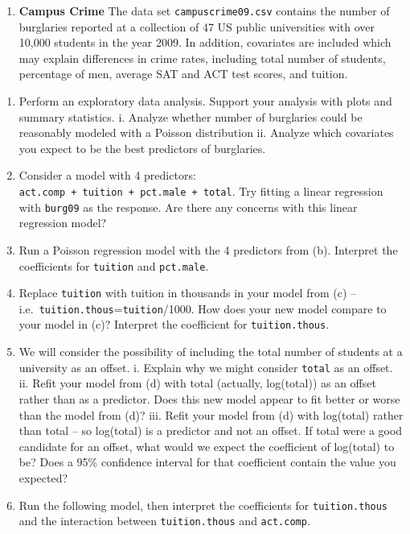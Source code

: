 \documentclass[
]{krantz}
\providecommand{\tightlist}{%
  \setlength{\itemsep}{0pt}\setlength{\parskip}{0pt}}
\begin{document}
\begin{enumerate}
\def\labelenumi{\arabic{enumi}.}
\setcounter{enumi}{4}
\tightlist
\item
  \textbf{Campus Crime} The data set \texttt{campuscrime09.csv} contains the number of burglaries reported at a collection of 47 US public universities with over 10,000 students in the year 2009. In addition, covariates are included which may explain differences in crime rates, including total number of students, percentage of men, average SAT and ACT test scores, and tuition.
\end{enumerate}

\begin{enumerate}
\def\labelenumi{\alph{enumi}.}
\tightlist
\item
  Perform an exploratory data analysis. Support your analysis with plots and summary statistics.
  i. Analyze whether number of burglaries could be reasonably modeled with a Poisson distribution
  ii. Analyze which covariates you expect to be the best predictors of burglaries.\\
\item
  Consider a model with 4 predictors: \texttt{act.comp\ +\ tuition\ +\ pct.male\ +\ total}. Try fitting a linear regression with \texttt{burg09} as the response. Are there any concerns with this linear regression model?
\item
  Run a Poisson regression model with the 4 predictors from (b). Interpret the coefficients for \texttt{tuition} and \texttt{pct.male}.
\item
  Replace \texttt{tuition} with tuition in thousands in your model from (c) -- i.e.~\texttt{tuition.thous}=\texttt{tuition}/1000. How does your new model compare to your model in (c)? Interpret the coefficient for \texttt{tuition.thous}.
\item
  We will consider the possibility of including the total number of students at a university as an offset.
  i. Explain why we might consider \texttt{total} as an offset.
  ii. Refit your model from (d) with total (actually, log(total)) as an offset rather than as a predictor. Does this new model appear to fit better or worse than the model from (d)?
  iii. Refit your model from (d) with log(total) rather than total -- so log(total) is a predictor and not an offset. If total were a good candidate for an offset, what would we expect the coefficient of log(total) to be? Does a 95\% confidence interval for that coefficient contain the value you expected?
\item
  Run the following model, then interpret the coefficients for \texttt{tuition.thous} and the interaction between \texttt{tuition.thous} and \texttt{act.comp}.
\end{enumerate}
\end{document}
